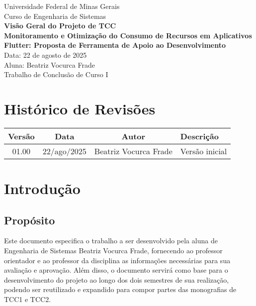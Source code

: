 \documentclass[12pt,a4paper]{article}
\begin{document}
\begin{center}
\Large
Universidade Federal de Minas Gerais \\
Curso de Engenharia de Sistemas \\[3cm]

\textbf{\LARGE Visão Geral do Projeto de TCC} \\[1cm]

\textbf{Monitoramento e Otimização do Consumo de Recursos em Aplicativos Flutter: Proposta de Ferramenta de Apoio ao Desenvolvimento} \\[4cm]

Data: 22 de agosto de 2025 \\[4cm]

Aluna: Beatriz Vocurca Frade \\[3cm]

Trabalho de Conclusão de Curso I
\end{center}

\newpage

\section*{Histórico de Revisões}

\begin{longtable}{|c|c|c|p{7cm}|}
\hline
\textbf{Versão} & \textbf{Data} & \textbf{Autor} & \textbf{Descrição} \\ \hline
01.00 & 22/ago/2025 & Beatriz Vocurca Frade & Versão inicial \\ \hline
\end{longtable}

\newpage

\tableofcontents
\newpage

\section{Introdução}

\subsection{Propósito}
Este documento especifica o trabalho a ser desenvolvido pela aluna de Engenharia de Sistemas Beatriz Vocurca Frade, fornecendo ao professor orientador e ao professor da disciplina as informações necessárias para sua avaliação e aprovação. Além disso, o documento servirá como base para o desenvolvimento do projeto ao longo dos dois semestres de sua realização, podendo ser reutilizado e expandido para compor partes das monografias de TCC1 e TCC2.
\end{document}
